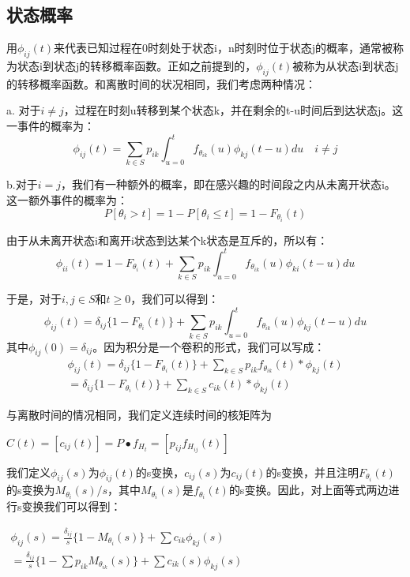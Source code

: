 \documentclass[UTF8]{ctexart}
\begin{document}
\subsection{状态概率}

用$\phi_{ij}(t)$来代表已知过程在0时刻处于状态i，n时刻时位于状态j的概率，通常被称为状态i到状态j的转移概率函数。正如之前提到的，$\phi_{ij}(t)$被称为从状态i到状态j的转移概率函数。和离散时间的状况相同，我们考虑两种情况：

a. 对于$i\ne j$，过程在时刻u转移到某个状态k，并在剩余的t-u时间后到达状态j。这一事件的概率为：
$$\phi_{ij}(t)=\sum_{k\in S} p_{ik}\int_{u=0}^t f_{\theta_{ik}}(u)\phi_{kj}(t-u)du  \quad i \ne j $$

b.对于$i=j$，我们有一种额外的概率，即在感兴趣的时间段之内从未离开状态i。这一额外事件的概率为：
$$P[\theta_i>t]=1-P[\theta_i\le t]=1-F_{\theta_i}(t)  $$

由于从未离开状态i和离开i状态到达某个k状态是互斥的，所以有：
$$\phi_{ii}(t)=1-F_{\theta_i}(t)+\sum_{k\in S} p_{ik}\int_{u=0}^t f_{\theta_{ik}}(u)\phi_{ki}(t-u)du $$ 

于是，对于$i,j\in S$和$t \ge 0$，我们可以得到：
$$\phi_{ij}(t)=\delta_{ij}\{1-F_{\theta_i}(t)\}+\sum_{k\in S} p_{ik}\int_{u=0}^t f_{\theta_{ik}}(u)\phi_{kj}(t-u)du $$ 
其中$\phi_{ij}(0) = \delta_{ij}$。因为积分是一个卷积的形式，我们可以写成：
$$\begin{aligned}
\phi_{ij}(t)=\delta_{ij}\{1-F_{\theta_i}(t)\}+\sum_{k \in S} p_{ik}f_{\theta_{ik}}(t)*\phi_{kj}(t) \\
=\delta_{ij}\{1-F_{\theta_i}(t)\}+\sum_{k \in S} c_{ik}(t)*\phi_{kj}(t)
\end{aligned}
$$

与离散时间的情况相同，我们定义连续时间的核矩阵为
\begin{center}
$C(t)=[c_{ij}(t)]=P\bullet f_{H_t}=[p_{ij}f_{H_{ij}}(t)]$
\end{center}

我们定义$\phi_{ij}(s)$为$\phi_{ij}(t)$的s变换，$c_{ij}(s)$为$c_{ij}(t)$的s变换，并且注明$F_{\theta_i}(t)$的s变换为$M_{\theta_i}(s)/s$，其中$M_{\theta_i}(s)$是$f_{\theta_i}(t)$的s变换。因此，对上面等式两边进行s变换我们可以得到：
\begin{center}
$\begin{aligned}
\phi_{ij}(s)=\frac{\delta_{ij}}{s}\{1-M_{\theta_i}(s)\}+\sum c_{ik}\phi_{kj}(s) \\
=\frac{\delta_{ij}}{s}\{1-\sum p_{ik}M_{\theta_{ik}}(s)\}+\sum c_{ik}(s)\phi_{kj}(s)
\end{aligned}
$ 
\end{center}
\end{document}
